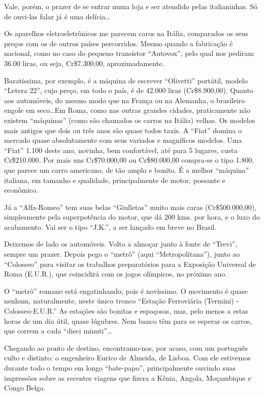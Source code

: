 Vale, porém, o prazer de se entrar numa loja e ser atendido pelas italianinhas. Só de ouvi-las falar já é uma delícia\ldots

Os aparelhos eletroeletrônicos me parecem caros na Itália, comparados os seus preços com os de outros países percorridos. Mesmo quando a fabricação é nacional, como no caso do pequeno transistor ``Autovox'', pelo qual nos pediram 36.00 liras, ou seja, Cr\$7.300,00, aproximadamente.

Baratíssima, por exemplo, é a máquina de escrever ``Olivetti'' portátil, modelo ``Letera 22'', cujo preço, em todo o país, é de 42.000 liras (Cr\$8.900,00). Quanto aos automóveis, do mesmo modo que na França ou na Alemanha, o brasileiro engole em seco\ldots Em Roma, como nas outras grandes cidades, praticamente não existem ``máquinas'' (como são chamados os carros na Itália) velhas. Os modelos mais antigos que dois ou três anos são quase todos taxis. A ``Fiat'' domina o mercado quase absolutamente com seus variados e magníficos modelos. Uma ``Fiat'' 1.100 deste ano, novinha, bem confortável, até para 5 lugares, custa Cr\$210.000. Por mais uns Cr\$70.000,00 ou Cr\$80.000,00 compra-se o tipo 1.800, que parece um carro americano, de tão amplo e bonito. É a melhor ``máquina'' italiana, em tamanho e qualidade, principalmente de motor, possante e econômico.

Já a ``Alfa-Romeo'' tem suas belas ``Giulletas'' muito mais caras (Cr\$500.000,00), simplesmente pela superpotência do motor, que dá 200 kms. por hora, e o luxo do acabamento. Vai ser o tipo ``J.K.'', a ser lançado em breve no Brasil.

Deixemos de lado os automóveis. Volto a almoçar junto à fonte de ``Trevi'', sempre um prazer. Depois pego o ``metrô'' (aqui ``Metropolitana''), junto ao ``Colosseo'' para visitar os trabalhos preparatórios para a Exposição Universal de Roma (E.U.R.), que coincidirá com os jogos olímpicos, no próximo ano.

O ``metrô'' romano está engatinhando, pois é novíssimo. O movimento é quase nenhum, naturalmente, neste único tronco ``Estação Ferroviária (Termini) - Colosseo-E.U.R.'' As estações são bonitas e espaçosas, mas, pelo menos a estas horas de um dia útil, quase lúgubres. Nem banco têm para se esperar os carros, que correm a cada ``dieci minuti''\ldots

Chegando ao ponto de destino, encontramo-nos, por acaso, com um português culto e distinto: o engenheiro Eurico de Almeida, de Lisboa. Com ele estivemos durante todo o tempo em longo ``bate-papo'', principalmente ouvindo suas impressões sobre as recentes viagens que fizera a Kênia, Angola, Moçambique e Congo Belga.

